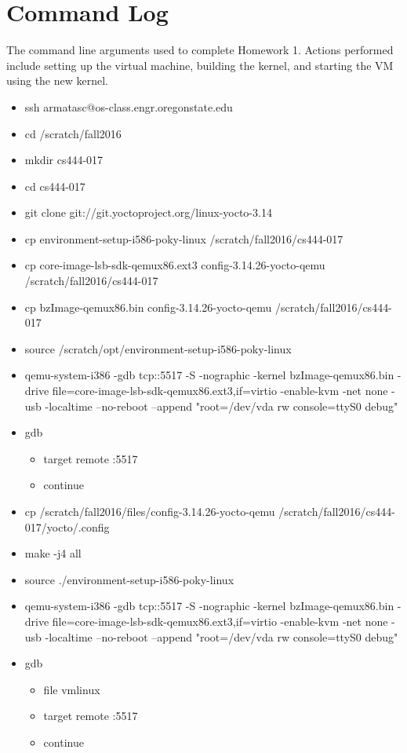 \documentclass[letterpaper,10pt,onecolumn]{IEEEtran}
\begin{document}
    \section*{Command Log}
    The command line arguments used to complete Homework 1. Actions performed include setting up the virtual machine, building the kernel, and starting the VM using the new kernel.
    \begin{itemize}
        \item ssh armatasc@os-class.engr.oregonstate.edu
        \item cd /scratch/fall2016
        \item mkdir cs444-017
        \item cd cs444-017
        \item git clone git://git.yoctoproject.org/linux-yocto-3.14
        \item cp environment-setup-i586-poky-linux /scratch/fall2016/cs444-017
        \item cp core-image-lsb-sdk-qemux86.ext3 config-3.14.26-yocto-qemu /scratch/fall2016/cs444-017
        \item cp bzImage-qemux86.bin config-3.14.26-yocto-qemu /scratch/fall2016/cs444-017
        \item source /scratch/opt/environment-setup-i586-poky-linux 
        \item qemu-system-i386 -gdb tcp::5517 -S -nographic -kernel bzImage-qemux86.bin -drive \-file=core-image-lsb-sdk-qemux86.ext3,if=virtio -enable-kvm -net none -usb \- -localtime --no-reboot --append "root=/dev/vda rw console=ttyS0 debug"
        \item gdb
        \begin{itemize}
            \item target remote :5517
            \item continue
        \end{itemize}
        \item cp /scratch/fall2016/files/config-3.14.26-yocto-qemu /scratch/fall2016/cs444-017/yocto/.config
        \item make -j4 all
        \item source ./environment-setup-i586-poky-linux
        \item qemu-system-i386 -gdb tcp::5517 -S -nographic -kernel bzImage-qemux86.bin -drive \-file=core-image-lsb-sdk-qemux86.ext3,if=virtio -enable-kvm -net none -usb \- -localtime --no-reboot --append "root=/dev/vda rw console=ttyS0 debug"
        \item gdb
        \begin{itemize}
            \item file vmlinux
            \item target remote :5517
            \item continue
        \end{itemize}
    \end{itemize}
    
\end{document}

